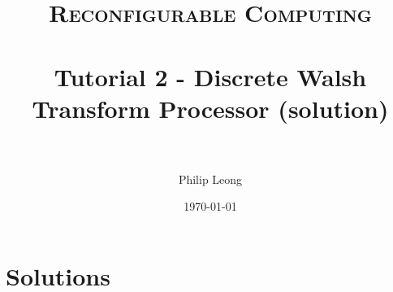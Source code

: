 \documentclass[paper=a4, fontsize=11pt]{scrartcl} %
\title{	
\normalfont \normalsize 
\textsc{Reconfigurable Computing} \\ [25pt] %
\horrule{0.5pt} \\[0.4cm] %
\huge Tutorial 2 - Discrete Walsh Transform Processor (solution) \\ %
\horrule{2pt} \\[0.5cm] %
}
\author{Philip Leong} %
\date{\normalsize\today} %
\begin{document}
\maketitle %



\newpage
\section{Solutions}


{}

\end{document}
